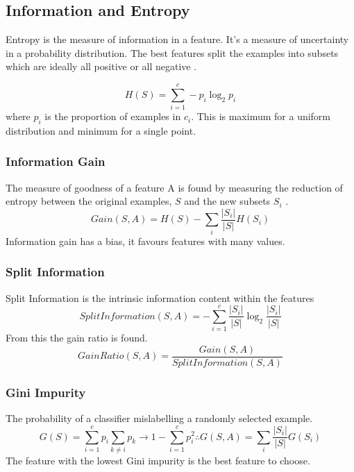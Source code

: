 \subsection{Information and Entropy}
Entropy is the measure of information in a feature. It's a measure of uncertainty in a probability distribution. The best features split the examples into subsets which are ideally all positive or all negative \cite{10.5555/2380985}.

\begin{equation}
H(S) = \sum_{i=1}^c-p_i\log_2p_i
\end{equation}
where $p_i$ is the proportion of examples in $c_i$. This is maximum for a uniform distribution and minimum for a single point.


\subsubsection{Information Gain}
The measure of goodness of a feature A is found by measuring the reduction of entropy between the original examples, $S$ and the new subsets $S_i$ \cite{10.5555/2380985}.
\begin{equation}
 Gain(S,A) = H(S) - \sum_i \frac{|S_i|}{|S|}H(S_i)
\end{equation}
Information gain has a bias, it favours features with many values.
\subsubsection{Split Information} 
Split Information is the intrinsic information content within the features
\begin{equation}
 SplitInformation(S,A) = - \sum_{i=1}^c\frac{|S_i|}{|S|}\log_2\frac{|S_i|}{|S|}
\end{equation}
From this the gain ratio is found.
\begin{equation}
 GainRatio(S,A) = \frac{Gain(S,A)}{SplitInformation(S,A)}
\end{equation}
\subsubsection{Gini Impurity}
The probability of a classifier mislabelling a randomly selected example.
\begin{equation}\label{eq:gini}
 G(S) = \sum_{i=1}^cp_i\sum_{k \neq i} p_k \to 1-\sum_{i=1}^cp_i^2 \therefore G(S,A) = \sum_i \frac{|S_i|}{|S|}G(S_i)
\end{equation}
The feature with the lowest Gini impurity is the best feature to choose.

